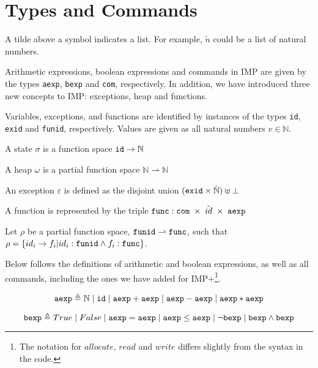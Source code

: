 
\section{Types and Commands}

\begin{notation}
A tilde above a symbol indicates a list. For example, $\tilde{n}$ could be a list of natural numbers.
\end{notation}

Arithmetic expressions, boolean expressions and commands in IMP are given by the types \verb|aexp|, \verb|bexp| and \verb|com|, respectively. In addition, we have introduced three new concepts to IMP: exceptions, heap and functions.

Variables, exceptions, and functions are identified by instances of the types \verb|id|, \verb|exid| and \verb|funid|, respectively. Values are given as all natural numbers $v\in\mathbb{N}$.

A state $\sigma$ is a function space $\verb|id| \rightarrow \mathbb{N}$

A heap $\omega$ is a partial function space $\mathbb{N} \rightharpoonup \mathbb{N}$

An exception $\varepsilon$ is defined as the disjoint union $(\verb|exid|\times\tilde{\mathbb{N}})\uplus\bot$

A function is represented by the triple $\verb|func|: \verb|com| \; \times \; \tilde{id} \; \times \; \verb|aexp|$

Let $\rho$ be a partial function space, 
$\verb|funid| \rightharpoonup \verb|func|$, 
such that 
$\rho = \{ id_i \rightarrow f_i | id_i : \verb|funid| \wedge f_i:\verb|func| \}$.

Below follows the definitions of arithmetic and boolean expressions, as well as all commands, including the ones we have added for IMP+\footnote{The notation for $allocate$, $read$ and $write$ differs slightly from the syntax in the code.}.

\begin{equation}
\verb|aexp| \triangleq \mathbb{N} \;|\; \verb|id| \;|\; \verb|aexp| + \verb|aexp| \;|\;  \verb|aexp| - \verb|aexp| \;|\;  \verb|aexp| * \verb|aexp|
\end{equation}

\begin{equation}
\verb|bexp| \triangleq True \;|\; False \;|\; \verb|aexp| = \verb|aexp| \;|\; \verb|aexp| \leq \verb|aexp| \;|\; \neg\verb|bexp| \;|\; \verb|bexp| \wedge \verb|bexp|
\end{equation}

